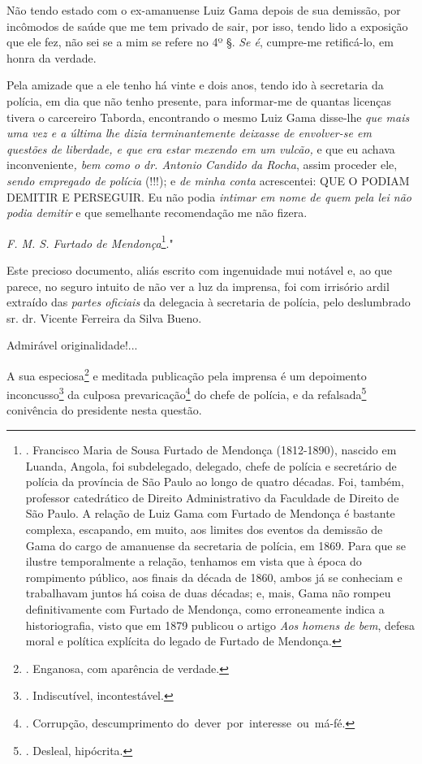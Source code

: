 Não tendo estado com o ex-amanuense Luiz Gama depois de sua demissão,
por incômodos de saúde que me tem privado de sair, por isso, tendo lido
a exposição que ele fez, não sei se a mim se refere no 4º §. \emph{Se
é}, cumpre-me retificá-lo, em honra da verdade.

Pela amizade que a ele tenho há vinte e dois anos, tendo ido à
secretaria da polícia, em dia que não tenho presente, para informar-me
de quantas licenças tivera o carcereiro Taborda, encontrando o mesmo
Luiz Gama disse-lhe \emph{que mais uma vez e a última lhe dizia
terminantemente deixasse de envolver-se em questões de liberdade, e que
era estar mexendo em um vulcão,} e que eu achava inconveniente\emph{,
bem como o dr. Antonio Candido da Rocha}, assim proceder ele,
\emph{sendo empregado de polícia} (!!!); e \emph{de minha conta}
acrescentei: QUE O PODIAM DEMITIR E PERSEGUIR. Eu não podia
\emph{intimar em nome de quem pela lei não podia demitir} e que
semelhante recomendação me não fizera.

\emph{F. M. S. Furtado de Mendonça}\footnote{. Francisco Maria de Sousa
  Furtado de Mendonça (1812-1890), nascido em Luanda, Angola, foi
  subdelegado, delegado, chefe de polícia e secretário de polícia da
  província de São Paulo ao longo de quatro décadas. Foi, também,
  professor catedrático de Direito Administrativo da Faculdade de
  Direito de São Paulo. A relação de Luiz Gama com Furtado de Mendonça é
  bastante complexa, escapando, em muito, aos limites dos eventos da
  demissão de Gama do cargo de amanuense da secretaria de polícia, em
  1869. Para que se ilustre temporalmente a relação, tenhamos em vista
  que à época do rompimento público, aos finais da década de 1860, ambos
  já se conheciam e trabalhavam juntos há coisa de duas décadas; e,
  mais, Gama não rompeu definitivamente com Furtado de Mendonça, como
  erroneamente indica a historiografia, visto que em 1879 publicou o
  artigo \emph{Aos homens de bem}, defesa moral e política explícita do
  legado de Furtado de Mendonça.}."

Este precioso documento, aliás escrito com ingenuidade mui notável e, ao
que parece, no seguro intuito de não ver a luz da imprensa, foi com
irrisório ardil extraído das \emph{partes oficiais} da delegacia à
secretaria de polícia, pelo deslumbrado sr. dr. Vicente Ferreira da
Silva Bueno.

Admirável originalidade!...

A sua especiosa\footnote{. Enganosa, com aparência de verdade.} e
meditada publicação pela imprensa é um depoimento inconcusso\footnote{.
  Indiscutível, incontestável.} da culposa prevaricação\footnote{.
  Corrupção, descumprimento do~dever~por~interesse~ou~má-fé.} do chefe
de polícia, e da refalsada\footnote{. Desleal, hipócrita.} conivência do
presidente nesta questão.

